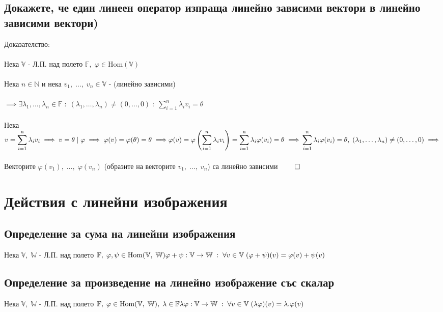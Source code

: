 \documentclass{article}
\newcommand{\V}{\mathbb{V}}
\newcommand{\N}{\mathbb{N}}
\newcommand{\F}{\mathbb{F}}
\newcommand{\W}{\mathbb{W}}
\newcommand{\n}[1]{#1_1, \dots, #1_n}
\newcommand{\OV}{\theta}
\begin{document}
    \subsection{Докажете, че един линеен оператор изпраща линейно зависими вектори в линейно зависими вектори)}
    Доказателство: \\\\
    Нека \(\V\) - Л.П. над полето \(\F, \; \varphi \in \mathrm{Hom}(\V)\) \\\\
    Нека \(n \in \N\) и нека \(v_1, \; \dots, \; v_n \in \V\) - (линейно зависими) \\\\
    \(\implies \exists \n{\lambda} \in \F \; : \;  (\n{\lambda}) \neq (0, \dots, 0) \; : \; \displaystyle\sum_{i = 1}^n \lambda_i v_i = \OV\) \\\\
    Нека \(v = \displaystyle\sum_{i = 1}^n \lambda_i v_i \implies v = \OV \; | \;\varphi
    \implies \varphi(v) = \varphi(\OV) = \OV \implies \\\\
    \varphi(v) = \varphi\left(\displaystyle\sum_{i = 1}^n \lambda_i v_i\right) = \displaystyle\sum_{i = 1}^n \lambda_i \varphi(v_i) = \OV \implies \\\\
    \displaystyle\sum_{i = 1}^n \lambda_i \varphi(v_i) = \OV, \; (\n{\lambda}) \neq (0, \dots, 0) \implies \) \\\\
    Векторите \(\varphi(v_1), \; \dots, \; \varphi(v_n)\) (образите на векторите \(v_1, \; \dots, \; v_n\))
    са линейно зависими \(\qed\) 
    \section{Действия с линейни изображения}
    \subsection{Определение за сума на линейни изображения}
    Нека \(\V, \; \W\) - Л.П. над полето \(\F, \; \varphi, \psi \in \mathrm{Hom}(\V, \; \W) \\\\
    \varphi + \psi : \V \to \W \; : \; \forall v \in \V \; (\varphi + \psi)(v) = \varphi(v) + \psi(v)\)
    \subsection{Определение за произведение на линейно изображение със скалар}
    Нека \(\V, \; \W\) - Л.П. над полето \(\F, \; \varphi \in \mathrm{Hom}(\V, \; \W), \; \lambda \in \F \\\\
    \lambda\varphi : \V \to \W \; : \; \forall v \in \V \; (\lambda\varphi)(v) = \lambda.\varphi(v)\)
\end{document}
